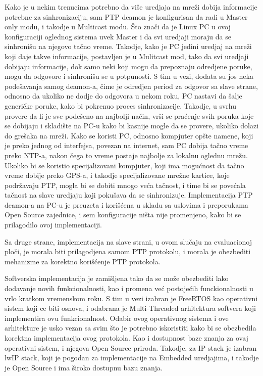 \documentclass[a4paper,12pt, master]{etf}
\begin{document}
	Kako je u nekim trenucima potrebno da vi\v{s}e uredjaja na mre\v{z}i dobija
	informacije potrebne za sinhronizaciju, sam PTP deamon je konfigurisan da
	radi u Master only modu, i takodje u Multicast modu. \v{S}to zna\v{c}i da
	je Linux PC u ovoj konfiguraciji oglednog sistema uvek Master i da svi
	uredjaji moraju da se sinhroni\v{s}u na njegovo ta\v{c}no vreme. Takodje,
	kako je PC jedini uredjaj na mre\v{z}i koji daje takve informacije,
	postavljen je u Mulitcast mod, tako da svi uredjaji dobijaju informacije,
	dok samo neki koji mogu da prepoznaju odredjene poruke, mogu da odgovore i
	sinhroni\v{s}u se u potpunosti. S tim u vezi, dodata su jos neka
	pode\v{s}avanja samog deamon-a, \v{c}ime je odredjen period za odgovor sa
	slave strane, odnosno da ukoliko ne dodje do odgovora u nekom roku, PC
	nastavi da \v{s}alje generi\v{c}ke poruke, kako bi pokrenuo proces
	sinhronizacije. Takodje, u svrhu provere da li je sve pode\v{s}eno na
	najbolji na\v{c}in, vr\v{s}i se pra\'{c}enje svih poruka koje se dobijaju i
	skladi\v{s}te na PC-u kako bi kasnije mogle da se provere, ukoliko dolazi
	do gre\v{s}aka na mre\v{z}i. Kako se koristi PC, odnosno kompjuter
	op\v{s}te namene, koji je preko jednog od interfejsa, povezan na internet,
	sam PC dobija ta\v{c}no vreme preko NTP-a, nakon \v{c}ega to vreme postaje
	najbolje za lokalnu oglednu mre\v{z}u. Ukoliko bi se koristio
	specijalizovani kompjuter, koji ima mogu\'{c}nost da ta\v{c}no vreme dobije
	preko GPS-a, i takodje specijalizovane mre\v{z}ne kartice, koje
	podr\v{z}avaju PTP, mogla bi se dobiti mnogo ve\'{c}a ta\v{c}nost, i time
	bi se pove\'{c}ala ta\v{c}nost na slave uredjaju koji poku\v{s}ava da se
	sinhronizuje. Implementacija PTP deamon-a na PC-u je preuzeta i
	kori\v{s}\'{c}ena u skladu sa uslovima i preporukama Open Source zajednice,
	i sem konfiguracije ni\v{s}ta nije promenjeno, kako bi se prilagodilo ovoj
	implementaciji.

    Sa druge strane, implementacija na slave strani, u ovom slu\v{c}aju na
	evaluacionoj plo\v{c}i, je morala biti prilagodjena samom PTP protokolu, i
	morala je obezbediti mehanizme za korektno kori\v{s}\'{c}enje PTP protokola.

	Softverska implementacija je zami\v{s}ljena tako da se mo\v{z}e obezbediti
	lako dodavanje novih funkcionalnosti, kao i promena ve\'{c} postoje\'{c}ih
	funckionalnosti u vrlo kratkom vremenskom roku. S tim u vezi izabran je
	FreeRTOS kao operativni sistem koji ce biti osnova, i odabrana je
	Multi-Threaded arhitektura softvera koji implementira ovu funkcionalnost.
	Odabir ovog operativnog sistema i ove arhitekture je usko vezan sa svim
	\v{s}to je potrebno iskoristiti kako bi se obezbedila korektna
	implementacija ovog protokola. Kao i dostupnost baze znanja za ovaj
	operativni sistem, i njegova Open Source priroda. Takodje, za IP stack je
	izabran lwIP stack, koji je pogodan za implementacije na Embedded
	uredjajima, i takodje je Open Source i ima \v{s}iroko dostupnu bazu znanja.
\end{document}
